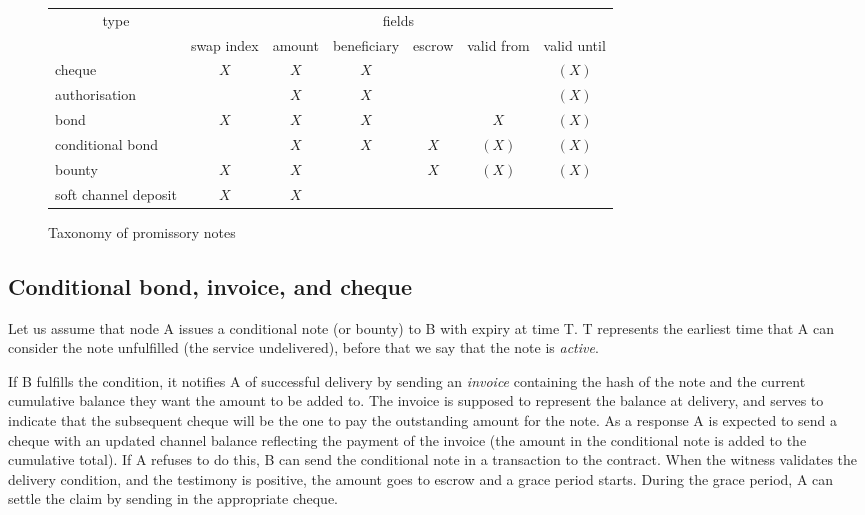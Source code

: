 \documentclass[a4paper,10pt]{article}
\newcommand\gloss[1]{\emph{\gls{#1}}}
\begin{document}
\newcommand{\tick}{$X$}
\newcommand{\opt}{$(X)$}
\begin{center}
\begin{figure}
\begin{center}
\begin{tabular}{|l||c|c|c|c|c|c|}
\hline
\multicolumn{1}{|c||}{type}
& \multicolumn{6}{c|}{fields}
\\
\cline{2-7}
& swap index
& amount
& beneficiary
& escrow
& valid from
& valid until
\\
\hline
\hline
cheque & \tick & \tick & \tick & & & \opt
\\
authorisation &  & \tick & \tick & & & \opt
\\
bond & \tick & \tick & \tick & & \tick & \opt
\\
conditional bond &  & \tick & \tick & \tick & \opt & \opt
\\
bounty & \tick &  \tick & & \tick & \opt & \opt
\\
soft channel deposit &  \tick & \tick & & & &
\\
\hline
\end{tabular}
\end{center}
\caption{Taxonomy of promissory notes}
\label{fig:taxonomy}
\end{figure}
\end{center}



\subsection{Conditional bond, invoice, and cheque}

Let us assume that node A issues a conditional note (or bounty) to B with expiry at time T.
T represents the earliest time that A can consider the note unfulfilled (the service undelivered), before
that we say that the note is \emph{active}.

If B fulfills the condition, it notifies A of successful delivery
by sending an \gloss{invoice} containing the hash of the note and the current cumulative balance they want the
amount to be added to. The invoice is supposed to represent the balance at delivery, and serves to
indicate that the subsequent cheque will be the one to pay the outstanding amount for the note.
As a response A is expected to send a cheque with an updated channel balance reflecting the
payment of the invoice (the amount in the conditional note is added to the cumulative total).
If A refuses to do this, B can send the conditional note in a transaction
to  the contract. When the witness validates the delivery condition, and the testimony is
positive, the amount goes to escrow and a grace period starts.
During the grace period, A can settle the claim by sending in the appropriate cheque.
\end{document}
